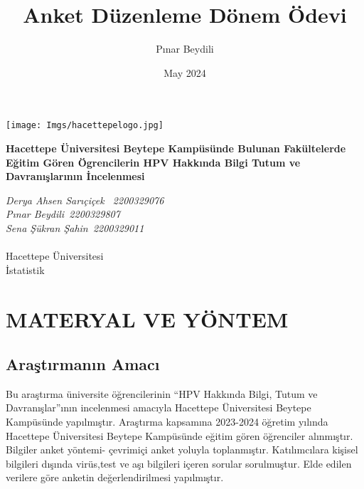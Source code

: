 \documentclass[turkish]{article}
\title{Anket Düzenleme Dönem Ödevi}
\author{Pınar Beydili}
\date{May 2024}
\begin{document}
\begin{titlepage}
    \begin{center}
 \begin{center}
            
            \centering
            \texttt{[image: Imgs/hacettepelogo.jpg]}
            \caption{}
            \label{}
        \end{center}   
        
        \vspace*{1cm}
        \Huge
        \textbf{Hacettepe Üniversitesi Beytepe Kampüsünde Bulunan Fakültelerde Eğitim Gören Ögrencilerin HPV Hakkında
Bilgi Tutum ve Davranışlarının İncelenmesi }
 
        \vfill
   
        \Large
        \textit{Derya Ahsen Sarıçiçek ~2200329076 \\
        Pınar Beydili~2200329807\\
        Sena Şükran Şahin~2200329011 \\
        }\\
        
        \vfill
        Hacettepe Üniversitesi \\
        İstatistik \\
        
    \end{center}
\end{titlepage}

\newpage

\tableofcontents
\clearpage

\section{MATERYAL VE YÖNTEM}

\subsection{Araştırmanın Amacı}
Bu araştırma üniversite öğrencilerinin “HPV Hakkında Bilgi, Tutum ve Davranışlar”ının incelenmesi amacıyla Hacettepe Üniversitesi Beytepe Kampüsünde yapılmıştır. 
Araştırma kapsamına 2023-2024 öğretim yılında Hacettepe Üniversitesi Beytepe Kampüsünde eğitim gören öğrenciler alınmıştır. Bilgiler anket yöntemi- çevrimiçi anket yoluyla toplanmıştır. Katılımcılara kişisel bilgileri dışında virüs,test ve aşı bilgileri içeren  sorular sorulmuştur. Elde edilen verilere göre anketin değerlendirilmesi yapılmıştır. 
\end{document}

